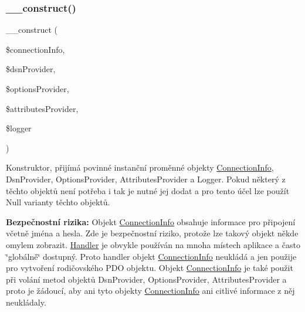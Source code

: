 \subsubsection{\texorpdfstring{\+\_\+\+\_\+construct()}{\_\_construct()}}
{\footnotesize\ttfamily \+\_\+\+\_\+construct (\begin{DoxyParamCaption}\item[{\mbox{\hyperlink{interface_pes_1_1_database_1_1_handler_1_1_connection_info_interface}{Connection\+Info\+Interface}}}]{\$connection\+Info,  }\item[{\mbox{\hyperlink{interface_pes_1_1_database_1_1_handler_1_1_dsn_provider_1_1_dsn_provider_interface}{Dsn\+Provider\+Interface}}}]{\$dsn\+Provider,  }\item[{\mbox{\hyperlink{interface_pes_1_1_database_1_1_handler_1_1_options_provider_1_1_options_provider_interface}{Options\+Provider\+Interface}}}]{\$options\+Provider,  }\item[{\mbox{\hyperlink{interface_pes_1_1_database_1_1_handler_1_1_attributes_provider_1_1_attributes_provider_interface}{Attributes\+Provider\+Interface}}}]{\$attributes\+Provider,  }\item[{Logger\+Interface}]{\$logger }\end{DoxyParamCaption})}

Konstruktor, přijímá povinné instanční proměnné objekty \mbox{\hyperlink{class_pes_1_1_database_1_1_handler_1_1_connection_info}{Connection\+Info}}, Dsn\+Provider, Options\+Provider, Attributes\+Provider a Logger. Pokud některý z těchto objektů není potřeba i tak je nutné jej dodat a pro tento účel lze použít Null varianty těchto objektů.

{\bfseries Bezpečnostní rizika\+:} Objekt \mbox{\hyperlink{class_pes_1_1_database_1_1_handler_1_1_connection_info}{Connection\+Info}} obsahuje informace pro připojení včetně jména a hesla. Zde je bezpečnostní riziko, protože lze takový objekt někde omylem zobrazit. \mbox{\hyperlink{class_pes_1_1_database_1_1_handler_1_1_handler}{Handler}} je obvykle používán na mnoha místech aplikace a často \char`\"{}globálně\char`\"{} dostupný. Proto handler objekt \mbox{\hyperlink{class_pes_1_1_database_1_1_handler_1_1_connection_info}{Connection\+Info}} neukládá a jen použije pro vytvoření rodičovského P\+DO objektu. Objekt \mbox{\hyperlink{class_pes_1_1_database_1_1_handler_1_1_connection_info}{Connection\+Info}} je také použit při volání metod objektů Dsn\+Provider, Options\+Provider, Attributes\+Provider a proto je žádoucí, aby ani tyto objekty \mbox{\hyperlink{class_pes_1_1_database_1_1_handler_1_1_connection_info}{Connection\+Info}} ani citlivé informace z něj neukládaly.


